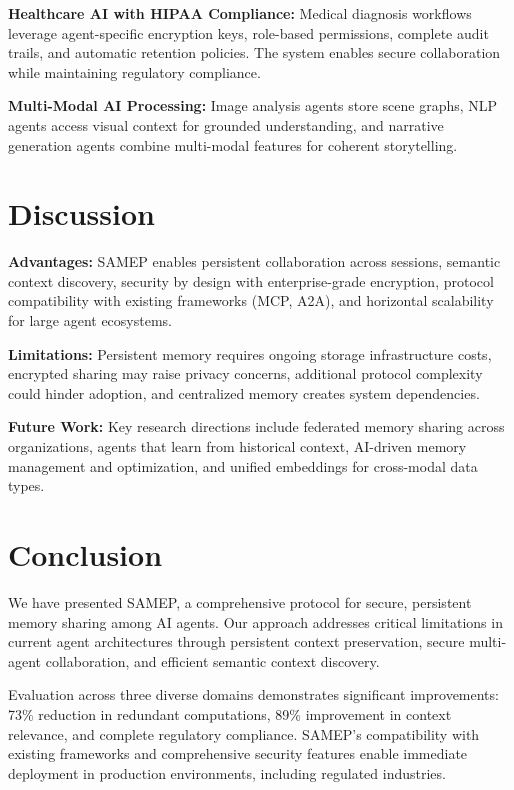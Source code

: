 \documentclass[11pt]{article}
\begin{document}
\textbf{Healthcare AI with HIPAA Compliance:} Medical diagnosis workflows leverage agent-specific encryption keys, role-based permissions, complete audit trails, and automatic retention policies. The system enables secure collaboration while maintaining regulatory compliance.

\textbf{Multi-Modal AI Processing:} Image analysis agents store scene graphs, NLP agents access visual context for grounded understanding, and narrative generation agents combine multi-modal features for coherent storytelling.

\section{Discussion}

\textbf{Advantages:} SAMEP enables persistent collaboration across sessions, semantic context discovery, security by design with enterprise-grade encryption, protocol compatibility with existing frameworks (MCP, A2A), and horizontal scalability for large agent ecosystems.

\textbf{Limitations:} Persistent memory requires ongoing storage infrastructure costs, encrypted sharing may raise privacy concerns, additional protocol complexity could hinder adoption, and centralized memory creates system dependencies.

\textbf{Future Work:} Key research directions include federated memory sharing across organizations, agents that learn from historical context, AI-driven memory management and optimization, and unified embeddings for cross-modal data types.

\section{Conclusion}

We have presented SAMEP, a comprehensive protocol for secure, persistent memory sharing among AI agents. Our approach addresses critical limitations in current agent architectures through persistent context preservation, secure multi-agent collaboration, and efficient semantic context discovery.

Evaluation across three diverse domains demonstrates significant improvements: 73\% reduction in redundant computations, 89\% improvement in context relevance, and complete regulatory compliance. SAMEP's compatibility with existing frameworks and comprehensive security features enable immediate deployment in production environments, including regulated industries.
\end{document}

